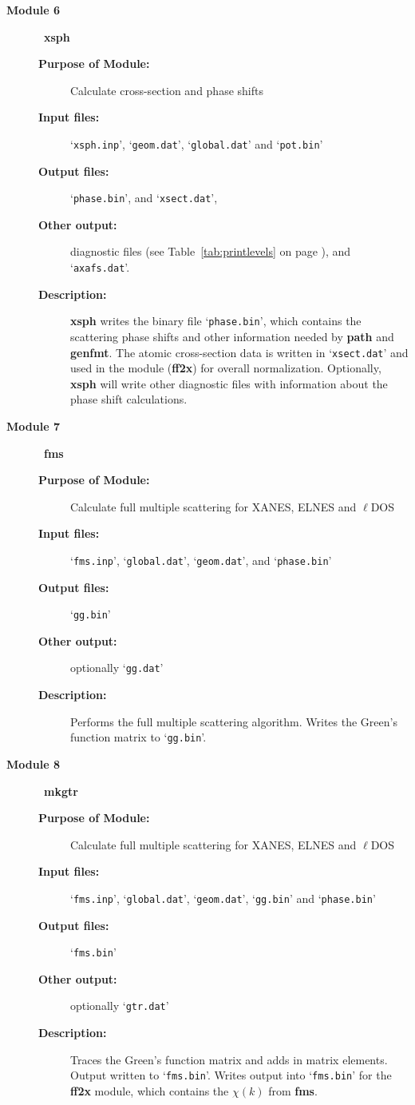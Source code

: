 \documentclass[11pt,oneside]{report} %
\newcommand{\file}[1]{`\texttt{#1}'}
\newcommand{\module}[1]{\textrm{\bf{#1}}}
\begin{document}
\begin{latexonly}
\begin{description}
\begin{description}
  \end{description}
\item [\large\textbf{Module 6}]\dotfill\  {\large\module{xsph}}
  \begin{description}
  \item[\textbf{Purpose of Module:}] Calculate cross-section and phase shifts
  \item[\textbf{Input files:}] \file{xsph.inp}, \file{geom.dat},
    \file{global.dat} and \file{pot.bin}
  \item[\textbf{Output files:}] \file{phase.bin}, and \file{xsect.dat},
  \item[\textbf{Other output:}] diagnostic files (see
  Table~\ref{tab:printlevels} on page \pageref{tab:printlevels}),
    and \file{axafs.dat}.
  \item[\textbf{Description:}]  \module{xsph} writes the binary file
    \file{phase.bin}, which contains the scattering phase shifts and
    other information needed by \module{path} and \module{genfmt}. 
    The  atomic  cross-section data is written in \file{xsect.dat} and
    used in the module (\module{ff2x}) for overall normalization.
    Optionally, \module{xsph} will write other diagnostic files with 
    information about the phase shift calculations.
  \end{description}
\item [\large\textbf{Module 7}]\dotfill\  {\large\module{fms}}
  \begin{description}
  \item[\textbf{Purpose of Module:}] Calculate full multiple
  scattering for XANES, ELNES and $\ell$DOS
  \item[\textbf{Input files:}] \file{fms.inp}, \file{global.dat},
     \file{geom.dat}, and \file{phase.bin}
  \item[\textbf{Output files:}] \file{gg.bin}
  \item[\textbf{Other output:}] optionally \file{gg.dat}
  \item[\textbf{Description:}]  Performs the full multiple scattering
    algorithm.  Writes the Green's function matrix to \file{gg.bin}.
  \end{description}
\item [\large\textbf{Module 8}]\dotfill\  {\large\module{mkgtr}}
  \begin{description}
  \item[\textbf{Purpose of Module:}] Calculate full multiple
  scattering for XANES, ELNES and $\ell$DOS
  \item[\textbf{Input files:}] \file{fms.inp}, \file{global.dat},
     \file{geom.dat}, \file{gg.bin} and \file{phase.bin}
  \item[\textbf{Output files:}] \file{fms.bin}
  \item[\textbf{Other output:}] optionally \file{gtr.dat}
  \item[\textbf{Description:}]  Traces the Green's function matrix and adds in
  matrix elements.  Output written to \file{fms.bin}.
    Writes output into \file{fms.bin} for the \module{ff2x} module, which
    contains the $\chi(k)$ from \module{fms}.


\end{description}
\end{description}
\end{latexonly}
\end{document}

